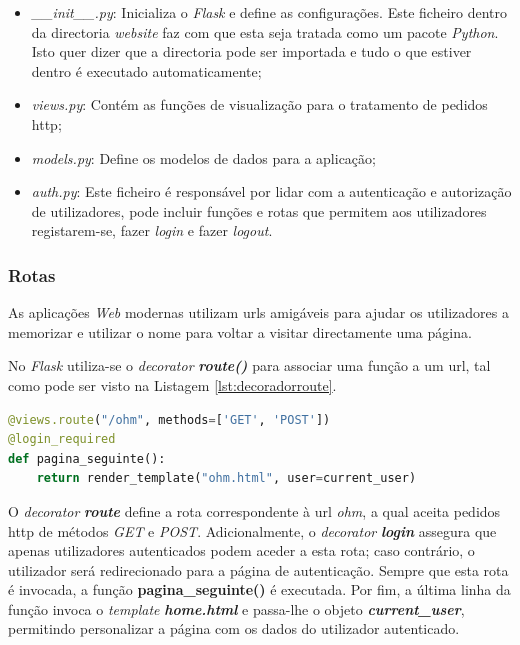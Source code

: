 \begin{itemize}
	\item \textit{\_\_init\_\_.py}: Inicializa o \textit{Flask} e define as configurações. Este ficheiro dentro da directoria \textit{website} faz com que esta seja tratada como um pacote \textit{Python}. Isto quer dizer que a directoria pode ser importada e tudo o que estiver dentro é executado automaticamente;
	\item \textit{views.py}: Contém as funções de visualização para o tratamento de pedidos \acrfull{http};
	\item \textit{models.py}: Define os modelos de dados para a aplicação;
	\item \textit{auth.py}: Este ficheiro é responsável por lidar com a autenticação e autorização de utilizadores, pode incluir funções e rotas que permitem aos utilizadores registarem-se, fazer \textit{login} e fazer \textit{logout}.
\end{itemize}

\subsubsection{Rotas}
As aplicações \textit{Web} modernas utilizam \acrshort{url}s amigáveis para ajudar os utilizadores a memorizar e utilizar o nome para voltar a visitar directamente uma página.

No \textit{Flask} utiliza-se o \textit{decorator} \textit{\textbf{route()}} para associar uma função a um \acrshort{url}, tal como pode ser visto na Listagem \ref{lst:decoradorroute}.

\begin{minipage}{0.9\linewidth}
	\begin{lstlisting}[language=Python, caption=\textit{Decorator} \textit{route()} - \textit{views.py}, label=lst:decoradorroute]
@views.route("/ohm", methods=['GET', 'POST'])
@login_required
def pagina_seguinte():
    return render_template("ohm.html", user=current_user)
\end{lstlisting}
\end{minipage}

O \textit{decorator} \textit{\textbf{route}} define a rota correspondente à \acrshort{url} \textit{ohm}, a qual aceita pedidos \acrshort{http} de métodos \textit{GET} e \textit{POST}. Adicionalmente, o \textit{decorator} \textit{\textbf{login}} assegura que apenas utilizadores autenticados podem aceder a esta rota; caso contrário, o utilizador será redirecionado para a página de autenticação. Sempre que esta rota é invocada, a função \textbf{pagina\_seguinte()} é executada. Por fim, a última linha da função invoca o \textit{template} \textit{\textbf{home.html}} e passa-lhe o objeto \textbf{\textit{current\_user}}, permitindo personalizar a página com os dados do utilizador autenticado.

